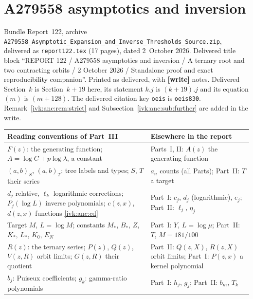\documentclass[11pt,letterpaper]{article}
\theoremstyle{remark}\newtheorem{remark}[theorem]{Remark}
\newcommand{\file}[1]{\nolinkurl{#1}}
\newcommand{\partsource}[1]{\par\noindent\begin{minipage}{\textwidth}\small #1\end{minipage}\par\medskip}
\begin{document}
\clearpage
\part{A279558 asymptotics and inversion}\label{ivk:anc:part}
\partsource{Bundle Report~122, archive \file{A279558_Asymptotic_Expansion_and_Inverse_Thresholds_Source.zip}, delivered as \file{report122.tex} (17 pages), dated 2~October 2026. Delivered title block ``REPORT 122 / A279558 asymptotics and inversion / A ternary root and two contracting orbits / 2 October 2026 / Standalone proof and exact reproducibility companion''. Printed as delivered, with \textbf{[write]} notes. Delivered Section~$k$ is Section~$k+19$ here, its statement $k.j$ is $(k+19).j$ and its equation $(m)$ is $(m+128)$. The delivered citation key \texttt{oeis} is \texttt{oeis830}. Remark~\ref{ivk:anc:rem:strict} and Subsection~\ref{ivk:anc:sub:further} are added in the write.}
\begin{center}
\small
\begin{tabular}{@{}>{\raggedright\arraybackslash}p{} >{\raggedright\arraybackslash}p{}@{}}
\toprule
Reading conventions of Part~III & Elsewhere in the report\\
\midrule
$F(z)$: the generating function; $A=\log C+p\log\lambda$, a constant & Parts~I, II: $A(z)$ the generating function\\
$(a,b)_S$, $(a,b)_T$: tree labels and types; $S$, $T$ their series & $a_n$ counts (all Parts); Part~II: $T$ a target\\
$d_j$ relative, $\ell_k$ logarithmic corrections; $P_j(\log L)$ inverse polynomials; $c(z,x)$, $d(z,x)$ functions \eqref{ivk:anc:cd} & Part~I: $c_j$, $d_j$ (logarithmic), $e_j$; Part~II: $\ell_j$, $\eta_j$\\
Target $M$, $L=\log M$; constants $M_*$, $B_*$, $Z$, $K_*$, $L_*$, $K_0$, $E_N$ & Part~I: $Y$, $L=\log\mu$; Part~II: $T$, $M=181/100$\\
$R(z)$: the ternary series; $P(z)$, $Q(z)$, $V(z,R)$ orbit limits; $G(z,R)$ their quotient & Part~II: $Q(z,X)$, $R(z,X)$ orbit limits; Part~I: $P(z,x)$ a kernel polynomial\\
$b_j$: Puiseux coefficients; $g_k$: gamma-ratio polynomials & Part~I: $h_j$, $g_j$; Part~II: $b_m$, $T_k$\\
\bottomrule
\end{tabular}
\end{center}
\end{document}
